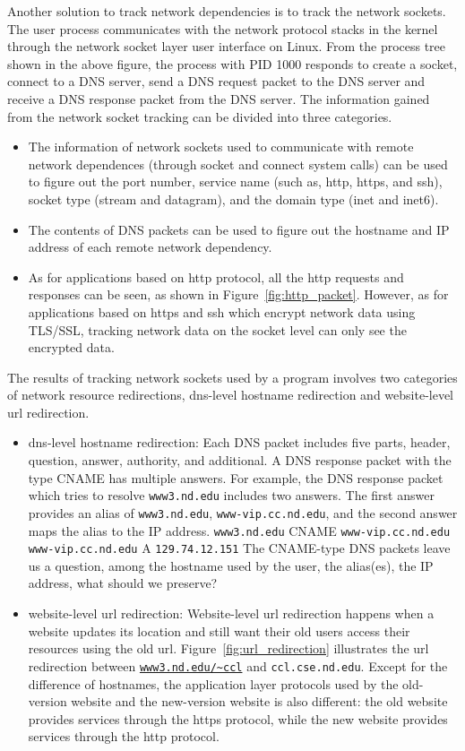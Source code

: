 \documentclass[procedia]{easychair}
\begin{document}
Another solution to track network dependencies is to track the network sockets. The user process communicates with the network protocol stacks in the kernel through the network socket layer user interface on Linux. From the process tree shown in the above figure, the process with PID 1000 responds to create a socket, connect to a DNS server, send a DNS request packet to the DNS server and receive a DNS response packet from the DNS server. The information gained from the network socket tracking can be divided into three categories.
\begin{itemize}
\item The information of network sockets used to communicate with remote network dependences (through socket and connect system calls) can be used to figure out the port number, service name (such as, http, https, and ssh), socket type (stream and datagram),  and the domain type (inet and inet6). 
\item The contents of DNS packets can be used to figure out the hostname and IP address of each remote network dependency. 
\item As for applications based on http protocol, all the http requests and responses can be seen, as shown in Figure~\ref{fig:http_packet}. However, as for applications based on https and ssh which encrypt network data using TLS/SSL, tracking network data on the socket level can only see the encrypted data. 
\end{itemize}

The results of tracking network sockets used by a program involves two categories of network resource redirections, dns-level hostname redirection and website-level url redirection. 
\begin{itemize}
\item dns-level hostname redirection: Each DNS packet includes five parts, header, question, answer, authority, and additional. A DNS response packet with the type CNAME has multiple answers. For example, the DNS response packet which tries to resolve {\tt www3.nd.edu} includes two answers. The first answer provides an alias of {\tt www3.nd.edu}, {\tt www-vip.cc.nd.edu}, and the second answer maps the alias to the IP address. 
{\tt www3.nd.edu} CNAME {\tt www-vip.cc.nd.edu}
{\tt www-vip.cc.nd.edu} A {\tt 129.74.12.151}
The CNAME-type DNS packets leave us a question, among the hostname used by the user, the alias(es), the IP address, what should we preserve?
\item website-level url redirection: Website-level url redirection happens when a website updates its location and still want their old users access their resources using the old url. Figure~\ref{fig:url_redirection} illustrates the url redirection between {\tt \url{www3.nd.edu/~ccl}} and {\tt ccl.cse.nd.edu}. Except for the difference of hostnames, the application layer protocols used by the old-version website and the new-version website is also different: the old website provides services through the https protocol, while the new website provides services through the http protocol. 
\end{itemize}
\end{document}
